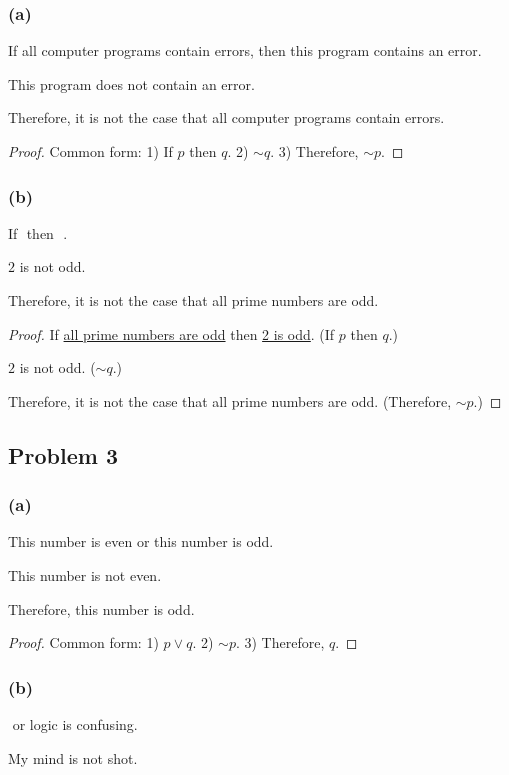 \documentclass[14pt]{extarticle}
\newcommand{\fbl}{\underline{\hspace{1cm}}\,\,}
\begin{document}
\subsubsection{(a)}
If all computer programs contain errors, then this program contains an error.

This program does not contain an error.

Therefore, it is not the case that all computer programs contain errors.

\begin{proof}
Common form: 1) If $p$ then $q$. 2) $\sim q$. 3) Therefore, $\sim p$.
\end{proof}

\subsubsection{(b)}
If \fbl then \fbl.

$2$ is not odd.

Therefore, it is not the case that all prime numbers are odd.

\begin{proof}
If \underline{all prime numbers are odd} then \underline{2 is odd}. (If $p$ then
$q$.)

$2$ is not odd. ($\sim q$.)

Therefore, it is not the case that all prime numbers are odd.
(Therefore, $\sim p$.)
\end{proof}

\subsection{Problem 3}
\subsubsection{(a)}
This number is even or this number is odd.

This number is not even.

Therefore, this number is odd.

\begin{proof}
Common form: 1) $p \vee q$. 2) $\sim p$. 3) Therefore, $q$.
\end{proof}

\subsubsection{(b)}
\fbl or logic is confusing.

My mind is not shot.
\end{document}
